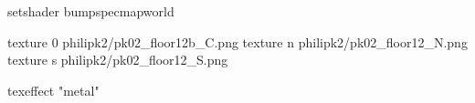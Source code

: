 setshader bumpspecmapworld

texture 0 philipk2/pk02_floor12b_C.png
texture n philipk2/pk02_floor12_N.png
texture s philipk2/pk02_floor12_S.png

texeffect "metal"
